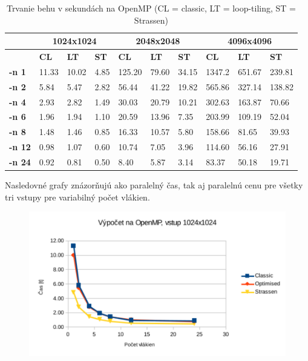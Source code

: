 \documentclass[slovak]{article}
\begin{document}
	\begin{table}\centering
		\begin{tabularx}{\textwidth}{|X|X|X|X|X|X|X|X|X|X|}
			\hline                        
			& \multicolumn{3}{|c|}{\textbf{1024x1024}} & \multicolumn{3}{|c|}{\textbf{2048x2048}} & \multicolumn{3}{|c|}{\textbf{4096x4096}} \\ \hline
			& \textbf{CL} & \textbf{LT} & \textbf{ST} & \textbf{CL} & \textbf{LT} & \textbf{ST} & \textbf{CL} & \textbf{LT} & \textbf{ST} \\ \hline
			\textbf{-n 1} & 11.33	& 10.02 & 4.85  & 125.20 & 79.60 & 34.15 & 1347.2 & 651.67 & 239.81\\ \hline
			\textbf{-n 2} & 5.84	& 5.47 &  2.82  & 56.44 & 41.22 & 19.82  & 565.86 & 327.14 & 138.82\\ \hline
			\textbf{-n 4} & 2.93	& 2.82 &  1.49  & 30.03 & 20.79 & 10.21  & 302.63 & 163.87 & 70.66\\ \hline
			\textbf{-n 6} & 1.96	& 1.94 &  1.10  & 20.59 & 13.96 & 7.35   & 203.99 & 109.19 & 52.04\\ \hline
			\textbf{-n 8} & 1.48	& 1.46 &  0.85  & 16.33 & 10.57 & 5.80   & 158.66 & 81.65 & 39.93\\ \hline
			\textbf{-n 12} & 0.98	& 1.07 &  0.60  & 10.74 & 7.05 & 3.96    & 114.60 & 56.16 & 27.91\\ \hline
			\textbf{-n 24} & 0.92	& 0.81 &  0.50  & 8.40 & 5.87 & 3.14     & 83.37 & 50.18 & 19.71\\ \hline
		\end{tabularx}
	\caption{Trvanie behu v sekundách na OpenMP (CL = classic, LT = loop-tiling, ST = Strassen)}
	\label{tab1}
	\end{table}

Nasledovné grafy znázorňujú ako paralelný čas, tak aj paralelnú cenu pre všetky tri vstupy pre variabilný počet vlákien.

\begin{figure}\centering
	\includegraphics[scale=1]{./images/1024_rychlost.pdf}
	\label{gr:graf1}
\end{figure}
\end{document}
